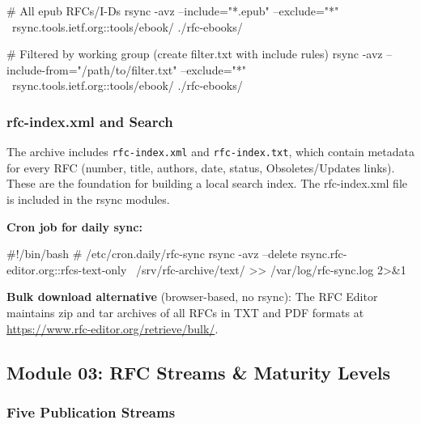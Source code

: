 \documentclass[11pt,letterpaper]{article}
\begin{document}
\begin{codebox}
# All epub RFCs/I-Ds
rsync -avz --include="*.epub" --exclude="*" \
  rsync.tools.ietf.org::tools/ebook/ ./rfc-ebooks/

# Filtered by working group (create filter.txt with include rules)
rsync -avz --include-from="/path/to/filter.txt" --exclude="*" \
  rsync.tools.ietf.org::tools/ebook/ ./rfc-ebooks/
\end{codebox}

\subsubsection{rfc-index.xml and Search}

The archive includes \texttt{rfc-index.xml} and \texttt{rfc-index.txt}, which contain metadata for every RFC (number, title, authors, date, status, Obsoletes/Updates links). These are the foundation for building a local search index. The rfc-index.xml file is included in the rsync modules.

\textbf{Cron job for daily sync:}

\begin{codebox}
#!/bin/bash
# /etc/cron.daily/rfc-sync
rsync -avz --delete rsync.rfc-editor.org::rfcs-text-only \
  /srv/rfc-archive/text/ >> /var/log/rfc-sync.log 2>&1
\end{codebox}

\textbf{Bulk download alternative} (browser-based, no rsync): The RFC Editor maintains zip and tar archives of all RFCs in TXT and PDF formats at \url{https://www.rfc-editor.org/retrieve/bulk/}.

\subsection{Module 03: RFC Streams \& Maturity Levels}

\subsubsection{Five Publication Streams}
\end{document}
